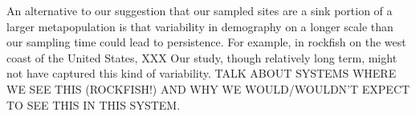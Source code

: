 \documentclass[12pt, oneside]{article}   	%
\begin{document}
An alternative to our suggestion that our sampled sites are a sink portion of a larger metapopulation is that variability in demography on a longer scale than our sampling time could lead to persistence. For example, in rockfish on the west coast of the United States, XXX Our study, though relatively long term, might not have captured this kind of variability. TALK ABOUT SYSTEMS WHERE WE SEE THIS (ROCKFISH!) AND WHY WE WOULD/WOULDN'T EXPECT TO SEE THIS IN THIS SYSTEM.

\end{document}
